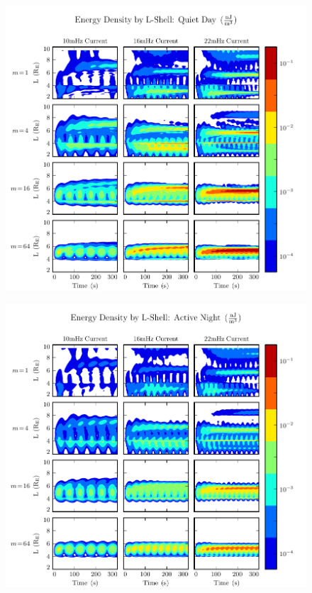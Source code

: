 \begin{figure}[H]
    \centering
    \includegraphics[width=\textwidth]{figures/ulayers_J_2.pdf}
    \caption[Energy Density by L-Shell: Quiet Day]{}
    \label{fig_ulayers_J_2}
\end{figure}

\begin{figure}[H]
    \centering
    \includegraphics[width=\textwidth]{figures/ulayers_J_3.pdf}
    \caption[Energy Density by L-Shell: Active Night]{}
    \label{fig_ulayers_J_3}
\end{figure}

